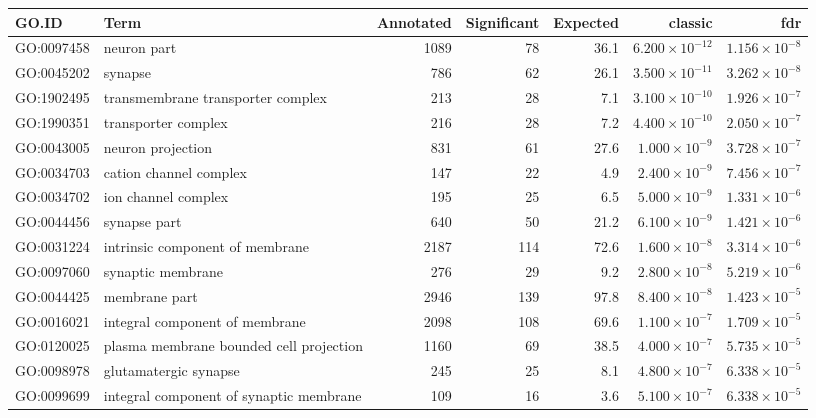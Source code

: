 \begin{table}[ht]
\centering
\begin{adjustbox}{max width=\textwidth}
\begin{tabular}{llrrrrr}
  \hline
GO.ID & Term & Annotated & Significant & Expected & classic & fdr \\ 
  \hline
GO:0097458 & neuron part & 1089 & 78 & 36.1 & $6.200 \times 10^{-12}$ & $1.156 \times 10^{-8}$ \\ 
  GO:0045202 & synapse & 786 & 62 & 26.1 & $3.500 \times 10^{-11}$ & $3.262 \times 10^{-8}$ \\ 
  GO:1902495 & transmembrane transporter complex & 213 & 28 & 7.1 & $3.100 \times 10^{-10}$ & $1.926 \times 10^{-7}$ \\ 
  GO:1990351 & transporter complex & 216 & 28 & 7.2 & $4.400 \times 10^{-10}$ & $2.050 \times 10^{-7}$ \\ 
  GO:0043005 & neuron projection & 831 & 61 & 27.6 & $1.000 \times 10^{-9}$ & $3.728 \times 10^{-7}$ \\ 
  GO:0034703 & cation channel complex & 147 & 22 & 4.9 & $2.400 \times 10^{-9}$ & $7.456 \times 10^{-7}$ \\ 
  GO:0034702 & ion channel complex & 195 & 25 & 6.5 & $5.000 \times 10^{-9}$ & $1.331 \times 10^{-6}$ \\ 
  GO:0044456 & synapse part & 640 & 50 & 21.2 & $6.100 \times 10^{-9}$ & $1.421 \times 10^{-6}$ \\ 
  GO:0031224 & intrinsic component of membrane & 2187 & 114 & 72.6 & $1.600 \times 10^{-8}$ & $3.314 \times 10^{-6}$ \\ 
  GO:0097060 & synaptic membrane & 276 & 29 & 9.2 & $2.800 \times 10^{-8}$ & $5.219 \times 10^{-6}$ \\ 
  GO:0044425 & membrane part & 2946 & 139 & 97.8 & $8.400 \times 10^{-8}$ & $1.423 \times 10^{-5}$ \\ 
  GO:0016021 & integral component of membrane & 2098 & 108 & 69.6 & $1.100 \times 10^{-7}$ & $1.709 \times 10^{-5}$ \\ 
  GO:0120025 & plasma membrane bounded cell projection & 1160 & 69 & 38.5 & $4.000 \times 10^{-7}$ & $5.735 \times 10^{-5}$ \\ 
  GO:0098978 & glutamatergic synapse & 245 & 25 & 8.1 & $4.800 \times 10^{-7}$ & $6.338 \times 10^{-5}$ \\ 
  GO:0099699 & integral component of synaptic membrane & 109 & 16 & 3.6 & $5.100 \times 10^{-7}$ & $6.338 \times 10^{-5}$ \\ 

\end{tabular}
\end{adjustbox}
\end{table}

